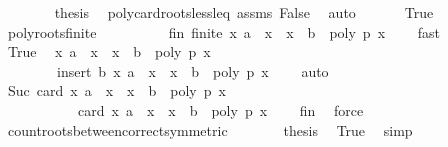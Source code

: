 \begin{isabellebody}
\ \ \ \ \ \ \isamarkupfalse%
\ {\isacharquery}thesis\ \isamarkupfalse%
\ poly{\isacharunderscore}card{\isacharunderscore}roots{\isacharunderscore}less{\isacharunderscore}leq\ assms\ False\ \isamarkupfalse%
\ auto\isanewline
\ \ \isamarkupfalse%
\isanewline
{}\isamarkupfalse%
\isanewline
\ \ \isamarkupfalse%
\ True\isanewline
\ \ \ \ \isamarkupfalse%
\ poly{\isacharunderscore}roots{\isacharunderscore}finite\isanewline
\ \ \ \ \ \ \ \ \isamarkupfalse%
\ fin{\isacharcolon}\ {\isachardoublequoteopen}finite\ {\isacharbraceleft}x{\isachardot}\ a\ {\isacharless}\ x\ {\isasymand}\ x\ {\isacharless}\ b\ {\isasymand}\ poly\ p\ x\ {\isacharequal}\ {}{\isacharbraceright}{\isachardoublequoteclose}\ \isamarkupfalse%
\ fast\isanewline
\ \ \ \ \isamarkupfalse%
\ True\ \isamarkupfalse%
\ {\isachardoublequoteopen}{\isacharbraceleft}x{\isachardot}\ a\ {\isacharless}\ x\ {\isasymand}\ x\ {\isasymle}\ b\ {\isasymand}\ poly\ p\ x\ {\isacharequal}\ {}{\isacharbraceright}\ {\isacharequal}\isanewline
\ \ \ \ \ \ \ \ insert\ b\ {\isacharbraceleft}x{\isachardot}\ a\ {\isacharless}\ x\ {\isasymand}\ x\ {\isacharless}\ b\ {\isasymand}\ poly\ p\ x\ {\isacharequal}\ {}{\isacharbraceright}{\isachardoublequoteclose}\ \isamarkupfalse%
\ auto\isanewline
\ \ \ \ \isamarkupfalse%
\ {\isachardoublequoteopen}Suc\ {\isacharparenleft}card\ {\isacharbraceleft}x{\isachardot}\ a\ {\isacharless}\ x\ {\isasymand}\ x\ {\isacharless}\ b\ {\isasymand}\ poly\ p\ x\ {\isacharequal}\ {}{\isacharbraceright}{\isacharparenright}\ {\isacharequal}\isanewline
\ \ \ \ \ \ \ \ \ \ \ card\ {\isacharbraceleft}x{\isachardot}\ a\ {\isacharless}\ x\ {\isasymand}\ x\ {\isasymle}\ b\ {\isasymand}\ poly\ p\ x\ {\isacharequal}\ {}{\isacharbraceright}{\isachardoublequoteclose}\ \isamarkupfalse%
\ fin\ \isamarkupfalse%
\ force\isanewline
\ \ \ \ \isamarkupfalse%
\ \isamarkupfalse%
\ count{\isacharunderscore}roots{\isacharunderscore}between{\isacharunderscore}correct{\isacharbrackleft}symmetric{\isacharbrackright}\isanewline
\ \ \ \ \isamarkupfalse%
\ \isamarkupfalse%
\ {\isacharquery}thesis\ \isamarkupfalse%
\ True\ \isamarkupfalse%
\ simp\isanewline
{}\isamarkupfalse%
%
\endisatagproof
{\isafoldproof}%
%
\isadelimproof

\end{isabellebody}
